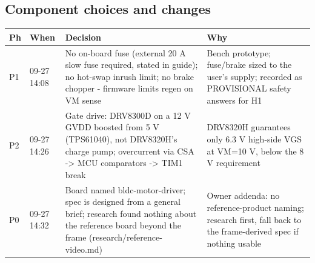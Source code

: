 \documentclass[11pt,a4paper]{article}
\begin{document}
\subsection*{Component choices and changes}
{\small
\begin{longtable}{lp{1.6cm}p{6.2cm}p{6.2cm}}
\toprule
\textbf{Ph} & \textbf{When} & \textbf{Decision} & \textbf{Why} \\
\midrule
\endhead
P1 & 09-27 14:08 & No on-board fuse (external 20 A slow fuse required, stated in guide); no hot-swap inrush limit; no brake chopper - firmware limits regen on VM sense & Bench prototype; fuse/brake sized to the user's supply; recorded as PROVISIONAL safety answers for H1 \\
P2 & 09-27 14:26 & Gate drive: DRV8300D on a 12 V GVDD boosted from 5 V (TPS61040), not DRV8320H's charge pump; overcurrent via CSA -\textgreater{} MCU comparators -\textgreater{} TIM1 break & DRV8320H guarantees only 6.3 V high-side VGS at VM=10 V, below the 8 V requirement \\
P0 & 09-27 14:32 & Board named bldc-motor-driver; spec is designed from a general brief; research found nothing about the reference board beyond the frame (research/reference-video.md) & Owner addenda: no reference-product naming; research first, fall back to the frame-derived spec if nothing usable \\
\bottomrule
\end{longtable}
}
\end{document}
